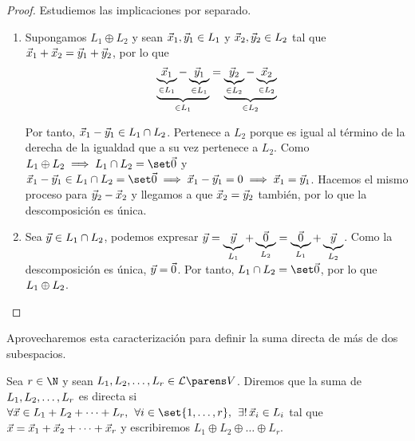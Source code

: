 \documentclass[../algebra_lineal.tex]{subfiles}
\begin{document}
\begin{proof}
    Estudiemos las implicaciones por separado.
    \begin{enumerate}
        \item[\protect\fbox{$\Rightarrow$}] Supongamos $L_1 \oplus L_2$ y sean $\vec{x}_1, \vec{y}_1 \in L_1$ y $\vec{x}_2, \vec{y}_2 \in L_2$ tal que $\vec{x}_1 + \vec{x}_2 = \vec{y}_1 + \vec{y}_2$, por lo que
        \[
            \underbrace{\underbrace{\vec{x}_1}_{\in L_1} - \underbrace{\vec{y}_1}_{\in L_1}}_{\in L_1} = \underbrace{\underbrace{\vec{y}_2}_{\in L_2} - \underbrace{\vec{x}_2}_{\in L_2}}_{\in L_2}
        \] 
        
        Por tanto, $\vec{x}_1 - \vec{y}_1 \in L_1 \cap L_2$. Pertenece a $L_2$ porque es igual al término de la derecha de la igualdad que a su vez pertenece a $L_2$. Como $\ds{L_1}{L_2} \implies \zvsint{L_1}{L_2}$ y $\vx_1 - \vy_1 \in L_1 \cap L_2 = \zvs \implies \vx_1 - \vy_1 = 0 \implies \vx_1 = \vy_1$. Hacemos el mismo proceso para $\vec{y}_2 - \vec{x}_2$ y llegamos a que $\vec{x}_2 = \vec{y}_2$ también, por lo que la descomposición es única.

        \item[\protect\fbox{$\Leftarrow$}] Sea $\vec{y} \in L_1 \cap L_2$, podemos expresar $\vec{y} = \underbrace{\vec{y}}_{L_1} + \underbrace{\vec{0}}_{L_2} = \underbrace{\vec{0}}_{L_1} + \underbrace{\vec{y}}_{L_2}$. Como la descomposición es única, $\vec{y} = \vec{0}$. Por tanto, $\zvsint{L_1}{L_2}$, por lo que $L_1 \oplus L_2$.  
    \end{enumerate}
\end{proof}

Aprovecharemos esta caracterización para definir la suma directa de más de dos subespacios. 
\begin{definition}
    Sea $r \in \N$ y sean $\dlst{L}{r} \in \subespaciosde{V}$. Diremos que la suma de ${L}_{1}, {L}_{2}, \dots, {L}_{r}$ es directa si $\forall \vx \in L_1 + L_2 + \dots + L_r, \spc \forall i \in \set{1, \dots, r}, \spc \exists ! \, \vx_i \in L_i$ tal que $\vec{x} = \vec{x}_1 + \vec{x}_2 + \dots + \vec{x}_r$ y escribiremos $L_1 \oplus L_2 \oplus \dots \oplus L_r$.
\end{definition}
\end{document}
